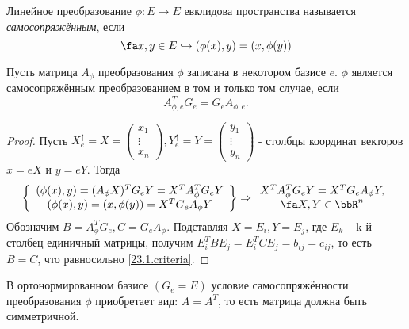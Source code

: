 \begin{defn}
  Линейное преобразование $\phi: E \rightarrow E$ евклидова пространства называется \textit{самосопряжённым}, если
  \begin{equation}\label{23.1.selfadjoint}
  \fa x,y \in E \hookrightarrow (\phi(x),y)=(x,\phi(y))
  \end{equation}
\end{defn}
  \begin{thm} Пусть матрица $A_\phi$ преобразования $\phi$ записана в некотором базисе $e$. $\phi$ является самосопряжённым преобразованием в том и только том случае, если
  \begin{equation}\label{23.1.criteria}
  A^T_{\phi,e}G_e=G_eA_{\phi,e}.
  \end{equation}  
  \end{thm}    
  \begin{proof}
  Пусть $X_e^\uparrow=X=
  \begin{pmatrix}
  x_1 \\ \vdots \\ x_n
  \end{pmatrix},Y_e^\uparrow=Y=
  \begin{pmatrix}
  y_1 \\ \vdots \\ y_n
  \end{pmatrix}$ - столбцы координат векторов $x=eX$ и $y=eY$. Тогда
  \begin{equation*}
  \left\lbrace \begin{array}{crl}
    (\phi(x),y)=(A_\phi X)^TG_eY=X^TA_\phi^TG_eY \\
    (\phi(x),y)=(x,\phi(y))=X^TG_eA_\phi Y \\
    \end{array}\right\rbrace \Rightarrow  \begin{array}{crl}
    X^TA_\phi^TG_eY=X^TG_eA_\phi Y, \\ \fa X,Y\in \bbR^n
  \end{array}     
  \end{equation*}   
  Обозначим $B=A_\phi^TG_e, C=G_eA_\phi$. Подставляя $X=E_i, Y=E_j$, где $E_k$ -- k-й столбец единичный матрицы, получим $E_i^TBE_j=E_i^TCE_j=b_{ij}=c_{ij}$, то есть $B=C$, что равносильно \eqref{23.1.criteria}.
  \end{proof}
  \begin{cons}
  В ортонормированном базисе $(G_e=E)$ условие самосопряжённости преобразования $\phi$ приобретает вид: $A=A^T$, то есть матрица должна быть симметричной.
  \end{cons}

